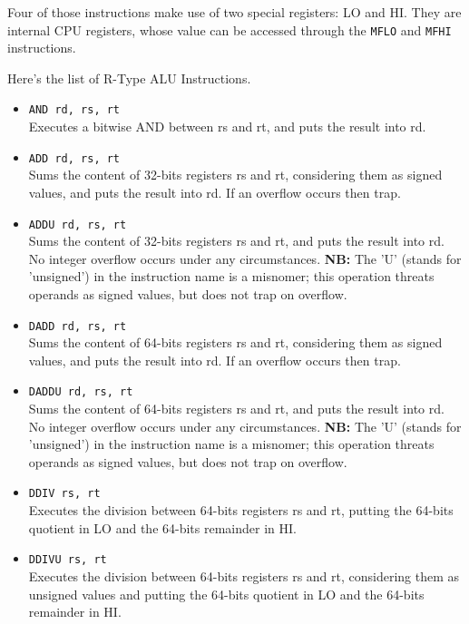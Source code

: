 \documentclass[12pt]{report}
\newcommand{\MISN}{\textbf{NB:} The 'U' (stands for 'unsigned') in the instruction name is a misnomer; 
this operation threats operands as signed values, but does not trap on overflow.}
\begin{document}
Four of those instructions make use of two special registers: LO and HI. They
are internal CPU registers, whose value can be accessed through the
\texttt{MFLO} and \texttt{MFHI} instructions.

Here's the list of R-Type ALU Instructions.

\begin{itemize}
	\item \texttt{AND rd, rs, rt}\\
	Executes a bitwise AND between rs and rt, and puts the result into rd.

	\item \texttt{ADD rd, rs, rt}\\
	Sums the content of 32-bits registers rs and rt, considering them as signed values, and puts
	the result into rd. If an overflow occurs then trap.

	\item \texttt{ADDU rd, rs, rt}\\
	Sums the content of 32-bits registers rs and rt, and puts the result into rd.
	No integer overflow occurs under any circumstances.
	\MISN{}

	\item \texttt{DADD rd, rs, rt}\\
	Sums the content of 64-bits registers rs and rt, considering them as signed values, and puts
	the result into rd. If an overflow occurs then trap.

	\item \texttt{DADDU rd, rs, rt}\\
	Sums the content of 64-bits registers rs and rt, and puts the result into rd.
	No integer overflow occurs under any circumstances.
	\MISN{}

	\item \texttt{DDIV rs, rt}\\
	Executes the division between 64-bits registers rs and rt, putting the 64-bits quotient in LO and the
	64-bits remainder in HI.

	\item \texttt{DDIVU rs, rt}\\
	Executes the division between 64-bits registers rs and rt, considering them as unsigned values
    	and putting the 64-bits quotient in LO and the 64-bits remainder in HI.
	

\end{itemize}
\end{document}
